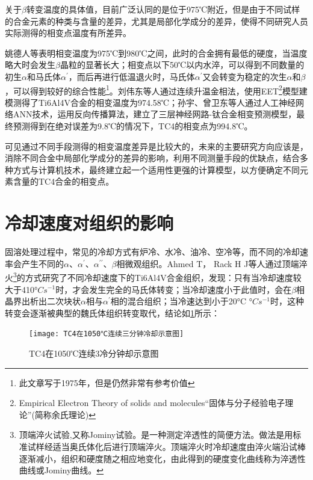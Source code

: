 \documentclass[
class = book,
zihao = -4,
font = noto,
paper = a4paper,
openany
]{easybook}
\newcommand{\ti}{Ti6Al4V}
\begin{document}
关于$\beta$转变温度的具体值，目前广泛认同的是位于975℃附近，但是由于不同试样的合金元素的种类与含量的差异，尤其是局部化学成分的差异，使得不同研究人员实际测得的相变点温度有所差异\cite{wangtaoTC4hejinxiangbianwendujiancezhongjieguobuyizhiyuanyinfenxi2013}。

姚德人等\cite{yaoderenTc4taihejinxiangbiandiandeceding1975}表明相变温度为975℃到980℃之间，此时的合金拥有最低的硬度，当温度略大时会发生$\beta$晶粒的显著长大；相变点以下50℃以内水淬，可以得到不同数量的初生$ \alpha $和马氏体$ \alpha^{\prime} $，而后再进行低温退火时，马氏体$ \alpha^{\prime} $又会转变为稳定的次生$ \alpha$和$ \beta $，可以得到较好的综合性能\footnote{\color{red}此文章写于1975年，但是仍然非常有参考价值}。刘伟东等人\cite{liuweidongTC4hejinVzhuanbianwendudejinxiangfacedingyulilunjisuan2014}通过连续升温金相法，使用EET\footnote{Empirical Electron Theory of solids and molecules“固体与分子经验电子理论”(简称余氏理论)}模型建模测得了\ti 合金的相变温度为974.58℃；孙宇、曾卫东等人\cite{sunyuYingyongrengongshenjingwangluoyanjiuhuaxueyuansuduitaihejinxiangbiandiandeyingxiang2010}通过人工神经网络ANN技术，运用反向传播算法，建立了三层神经网路-钛合金相变预测模型，最终预测得到在绝对误差为9.8℃的情况下，TC4的相变点为994.8℃。

可见通过不同手段测得的相变温度差异是比较大的，未来的主要研究方向应该是，消除不同合金中局部化学成分的差异的影响，利用不同测量手段的优缺点，结合多种方式与计算机技术，最终建立起一个适用性更强的计算模型，以方便确定不同元素含量的TC4合金的相变点。
\section{冷却速度对组织的影响}
固溶处理过程中，常见的冷却方式有炉冷、水冷、油冷、空冷等，而不同的冷却速率会产生不同的$ \alpha  $、$ \alpha  ^{\prime}$、$ \alpha  ^{\prime\prime}$、$ \beta$相微观组织\cite{malinovModellingCorrelationProcessing2001}。Ahmed T， Rack H J等人通过顶端淬火\footnote{顶端淬火试验,又称Jominy试验。是一种测定淬透性的简便方法。做法是用标准试样经适当奥氏体化后进行顶端淬火。顶端淬火时冷却速度由淬火端沿试棒逐渐减小，组织和硬度随之相应地变化，由此得到的硬度变化曲线称为淬透性曲线或Jominy曲线。}的方式研究\cite{ahmedPhaseTransformationsCooling1998}了不同冷却速度下的\ti 合金组织，发现：只有当冷却速度较大于410°$C  s^{- 1} $时，才会发生完全的马氏体转变；当冷却速度小于此值时，会在$ \beta $相晶界出析出二次块状$\alpha  $相与$ \alpha^{\prime} $相的混合组织；当冷速达到小于20°C °$C  s^{- 1} $时，这种转变会逐渐被典型的魏氏体组织转变取代，结论如\ref{fig:tc41050c3}所示：
\begin{figure}[h!]
	\centering
	\texttt{[image: TC4在1050℃连续三分钟冷却示意图]}
	\caption{TC4在1050℃连续3冷分钟却示意图}
	\label{fig:tc41050c3}
\end{figure}
\end{document}

